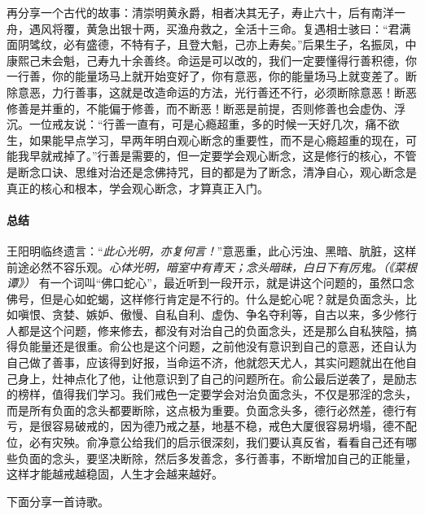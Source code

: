 再分享一个古代的故事：清崇明黄永爵，相者决其无子，寿止六十，后有南洋一舟，遇风将覆，黄急出银十两，买渔舟救之，全活十三命。复遇相士骇曰：“君满面阴骘纹，必有盛德，不特有子，且登大魁，己亦上寿矣。”后果生子，名振凤，中康熙己未会魁，己寿九十余善终。命运是可以改的，我们一定要懂得行善积德，你一行善，你的能量场马上就开始变好了，你有意恶，你的能量场马上就变差了。断除意恶，力行善事，这就是改造命运的方法，光行善还不行，必须断除意恶！断恶修善是并重的，不能偏于修善，而不断恶！断恶是前提，否则修善也会虚伪、浮沉。一位戒友说：“行善一直有，可是心瘾超重，多的时候一天好几次，痛不欲生，如果能早点学习，早两年明白观心断念的重要性，而不是心瘾超重的现在，可能我早就戒掉了。”行善是需要的，但一定要学会观心断念，这是修行的核心，不管是断念口诀、思维对治还是念佛持咒，目的都是为了断念，清净自心，观心断念是真正的核心和根本，学会观心断念，才算真正入门。

\paragraph{总结}

王阳明临终遗言：“\textit{此心光明，亦复何言！}”意恶重，此心污浊、黑暗、肮脏，这样前途必然不容乐观。\textit{心体光明，暗室中有青天；念头暗昧，白日下有厉鬼。（《菜根谭》）} 有一个词叫“佛口蛇心”，最近听到一段开示，就是讲这个问题的，虽然口念佛号，但是心如蛇蝎，这样修行肯定是不行的。什么是蛇心呢？就是负面念头，比如嗔恨、贪婪、嫉妒、傲慢、自私自利、虚伪、争名夺利等，自古以来，多少修行人都是这个问题，修来修去，都没有对治自己的负面念头，还是那么自私狭隘，搞得负能量还是很重。俞公也是这个问题，之前他没有意识到自己的意恶，还自认为自己做了善事，应该得到好报，当命运不济，他就怨天尤人，其实问题就出在他自己身上，灶神点化了他，让他意识到了自己的问题所在。俞公最后逆袭了，是励志的榜样，值得我们学习。我们戒色一定要学会对治负面念头，不仅是邪淫的念头，而是所有负面的念头都要断除，这点极为重要。负面念头多，德行必然差，德行有亏，是很容易破戒的，因为德乃戒之基，地基不稳，戒色大厦很容易坍塌，德不配位，必有灾殃。俞净意公给我们的启示很深刻，我们要认真反省，看看自己还有哪些负面的念头，要坚决断除，然后多发善念，多行善事，不断增加自己的正能量，这样才能越戒越稳固，人生才会越来越好。

下面分享一首诗歌。

